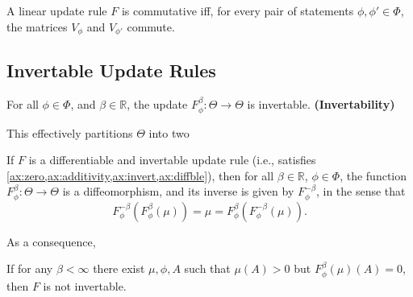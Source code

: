 \documentclass{article}
\begin{document}
\begin{prop}
    A linear update rule $F$ is commutative iff, for every pair of statements  $\phi, \phi' \in \Phi$, the
    matrices $V_\phi$ and $V_{\phi'}$ commute.
\end{prop}



\subsection{Invertable Update Rules}
\begin{URaxioms}
    \item For all $\phi\in\Phi$, and $\beta \in \mathbb R$, the update
    $F^{\beta}_{\phi}: \Theta \to \Theta$ is invertable.
    \hfill\textbf{(Invertability)} \label{ax:invert}
\end{URaxioms}


This effectively partitions $\Theta$ into two


\begin{prop}
    If $F$ is a differentiable and invertable update rule (i.e., satisfies \cref{ax:zero,ax:additivity,ax:invert,ax:diffble}), then for all $\beta \in \mathbb R$, $\phi \in \Phi$, the function
    $F^\beta_\phi : \Theta \to \Theta$
    is a diffeomorphism, and its inverse is given by $F^{-\beta}_\phi$, in the sense that
    \[
        F^{-\beta}_\phi( F^{\beta}_\phi (\mu) ) = \mu = F^{\beta}_\phi( F^{-\beta}_\phi (\mu) ).
     \]
\end{prop}




As a consequence,
\begin{coro}
    If for any $\beta < \infty$ there exist $\mu, \phi, A$ such that
    $\mu(A) > 0$  but $F^{\beta}_\phi(\mu)(A) = 0$, then $F$ is not invertable.
\end{coro}
\end{document}
